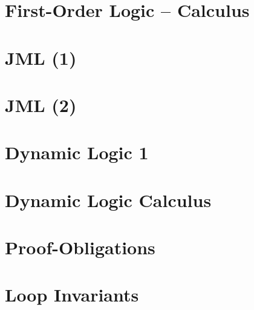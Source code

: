 \documentclass[12pt,accentcolor=tud1b,bibtotoc,colorback,linedtoc,liststotoc,bigchapter,noresetcounter]{tudreport}
\begin{document}
\newpage

\section{First-Order Logic -- Calculus}

\newpage

\section{JML (1)}

\newpage

\section{JML (2)}

\newpage

\section{Dynamic Logic 1}

\newpage

\section{Dynamic Logic Calculus}

\newpage

\section{Proof-Obligations}

\newpage

\section{Loop Invariants}

\newpage
 
\end{document}
